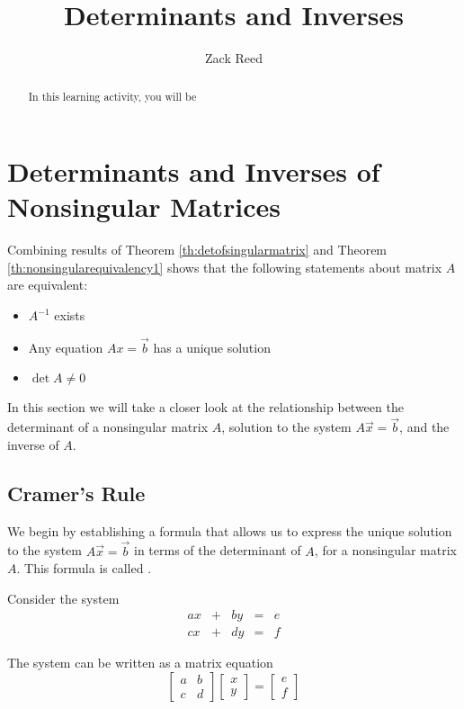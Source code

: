 \documentclass{ximera}
\author{Zack Reed}
\title{Determinants and Inverses}
\begin{document}
\begin{abstract}

    In this learning activity, you will be 
\end{abstract}
\maketitle


\section*{Determinants and Inverses of Nonsingular Matrices}
 
Combining results of Theorem \ref{th:detofsingularmatrix} and Theorem \ref{th:nonsingularequivalency1} shows that the following statements about matrix $A$ are equivalent:
\begin{itemize}
\item $A^{-1}$ exists
\item Any equation $Ax=\vec{b}$ has a unique solution
\item $\det{A}\neq 0$
\end{itemize}
In this section we will take a closer look at the relationship between the determinant of a nonsingular matrix $A$, solution to the system $A\vec{x}=\vec{b}$, and the inverse of $A$. 
\subsection*{Cramer's Rule}
We begin by establishing a formula that allows us to express the unique solution to the system $A\vec{x}=\vec{b}$ in terms of the determinant of $A$, for a nonsingular matrix $A$.  This formula is called .
 
Consider the system
$$\begin{array}{ccccc}
      ax& +&by&=&e\\
      cx & +&dy&= &f
    \end{array}$$
     
 The system can be written as a matrix equation
 $$\begin{bmatrix}a&b\\c&d\end{bmatrix}\begin{bmatrix}x\\y\end{bmatrix}=\begin{bmatrix}e\\f\end{bmatrix}$$
  
\end{document}
